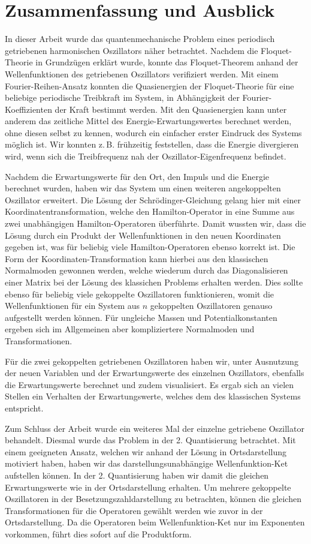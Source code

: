 \chapter{Zusammenfassung und Ausblick}
\label{6}
In dieser Arbeit wurde das quantenmechanische Problem eines periodisch getriebenen harmonischen Oszillators näher betrachtet.
Nachdem die Floquet-Theorie in Grundzügen erklärt wurde, konnte das Floquet-Theorem anhand der Wellenfunktionen des getriebenen Oszillators verifiziert werden.
Mit einem Fourier-Reihen-Ansatz konnten die Quasienergien der Floquet-Theorie für eine beliebige periodische Treibkraft im System, in Abhängigkeit der Fourier-Koeffizienten der Kraft bestimmt werden.
Mit den Quasienergien kann unter anderem das zeitliche Mittel des Energie-Erwartungswertes berechnet werden, ohne diesen selbst zu kennen, wodurch ein einfacher erster Eindruck des Systems möglich ist.
Wir konnten z.\,B. frühzeitig feststellen, dass die Energie divergieren wird, wenn sich die Treibfrequenz nah der Oszillator-Eigenfrequenz befindet.

Nachdem die Erwartungswerte für den Ort, den Impuls und die Energie berechnet wurden, haben wir das System um einen weiteren angekoppelten Oszillator erweitert.
Die Lösung der Schrödinger-Gleichung gelang hier mit einer Koordinatentransformation, welche den Hamilton-Operator in eine Summe aus zwei unabhängigen Hamilton-Operatoren überführte.
Damit wussten wir, dass die Lösung durch ein Produkt der Wellenfunktionen in den neuen Koordinaten gegeben ist, was für beliebig viele Hamilton-Operatoren ebenso korrekt ist.
Die Form der Koordinaten-Transformation kann hierbei aus den klassischen Normalmoden gewonnen werden, welche wiederum durch das Diagonalisieren einer Matrix bei der Lösung des klassichen Problems erhalten werden.
Dies sollte ebenso für beliebig viele gekoppelte Oszillatoren funktionieren, womit die Wellenfunktionen für ein System aus $n$ gekoppelten Oszillatoren genauso aufgestellt werden können.
Für ungleiche Massen und Potentialkonstanten ergeben sich im Allgemeinen aber kompliziertere Normalmoden und Transformationen.

Für die zwei gekoppelten getriebenen Oszillatoren haben wir, unter Ausnutzung der neuen Variablen und der Erwartungswerte des einzelnen Oszillators, ebenfalls die Erwartungswerte berechnet und zudem visualisiert.
Es ergab sich an vielen Stellen ein Verhalten der Erwartungswerte, welches dem des klassischen Systems entspricht.

Zum Schluss der Arbeit wurde ein weiteres Mal der einzelne getriebene Oszillator behandelt.
Diesmal wurde das Problem in der 2. Quantisierung betrachtet.
Mit einem geeigneten Ansatz, welchen wir anhand der Lösung in Ortsdarstellung motiviert haben, haben wir das darstellungsunabhängige Wellenfunktion-Ket aufstellen können.
In der 2. Quantisierung haben wir damit die gleichen Erwartungswerte wie in der Ortsdarstellung erhalten.
Um mehrere gekoppelte Oszillatoren in der Besetzungszahldarstellung zu betrachten, können die gleichen Transformationen für die Operatoren gewählt werden wie zuvor in der Ortsdarstellung.
Da die Operatoren beim Wellenfunktion-Ket nur im Exponenten vorkommen, führt dies sofort auf die Produktform.

